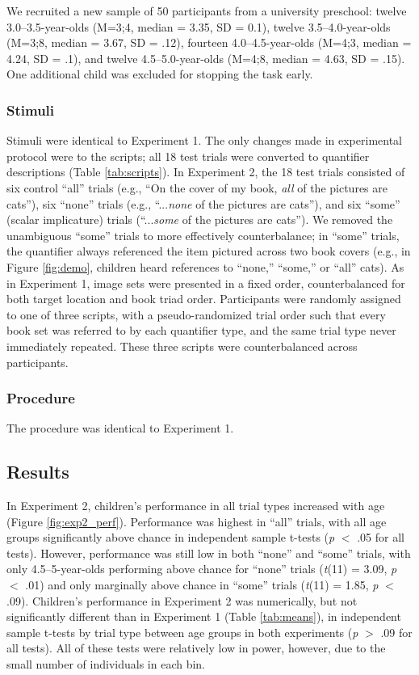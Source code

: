 \documentclass[man]{apa2}
\begin{document}
We recruited a new sample of 50 participants from a university preschool: twelve 3.0--3.5-year-olds (M=3;4, median = 3.35, SD = 0.1), twelve 3.5--4.0-year-olds (M=3;8, median = 3.67, SD = .12), fourteen 4.0--4.5-year-olds (M=4;3, median = 4.24, SD = .1), and twelve 4.5--5.0-year-olds (M=4;8, median = 4.63, SD = .15). One additional child was excluded for stopping the task early.

\subsubsection{Stimuli}
Stimuli were identical to Experiment 1. The only changes made in experimental protocol were to the scripts;  all 18 test trials were converted to quantifier descriptions (Table \ref{tab:scripts}). In Experiment 2, the 18 test trials consisted of six control ``all'' trials (e.g., ``On the cover of my book, \textit{all} of the pictures are cats''), six ``none'' trials (e.g., ``...\textit{none} of the pictures are cats''), and six ``some'' (scalar implicature) trials (``...\textit{some} of the pictures are cats''). We removed the unambiguous ``some'' trials to more effectively counterbalance; in ``some'' trials, the quantifier always referenced the item pictured across two book covers (e.g., in Figure \ref{fig:demo}, children heard references to ``none,'' ``some,'' or ``all'' cats). As in Experiment 1, image sets were presented in a fixed order, counterbalanced for both target location and book triad order. Participants were randomly assigned to one of three scripts, with a pseudo-randomized trial order such that every book set was referred to by each quantifier type, and the same trial type never immediately repeated. These three scripts were counterbalanced across participants.

\subsubsection{Procedure}
The procedure was identical to Experiment 1. 

\subsection{Results}

In Experiment 2, children's performance in all trial types increased with age (Figure \ref{fig:exp2_perf}). Performance was highest in ``all'' trials, with all age groups significantly above chance in independent sample t-tests (\emph{p} $<$ .05 for all tests). However, performance was still low in both ``none'' and ``some'' trials, with only 4.5--5-year-olds performing above chance for ``none'' trials (\textit{t}(11) = 3.09, \textit{p} $<$ .01) and only marginally above chance in ``some'' trials (\textit{t}(11) = 1.85, \textit{p} $<$ .09). Children's performance in Experiment 2 was numerically, but not significantly different than in Experiment 1 (Table \ref{tab:means}), in independent sample t-tests by trial type between age groups in both experiments (\emph{p} $>$ .09 for all tests). All of these tests were relatively low in power, however, due to the small number of individuals in each bin.
\end{document}
